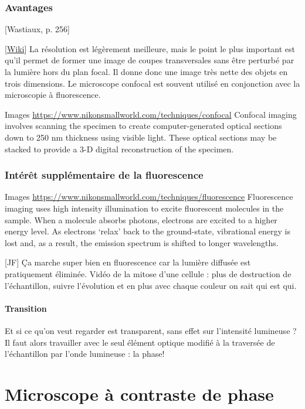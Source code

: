 \documentclass[11pt]{report}
\numberwithin{figure}{section}
\numberwithin{equation}{section}
\numberwithin{table}{section}
\newcommand{\1}{\boldsymbol{1}}
\begin{document}
\subsubsection{Avantages}

[Wastiaux, p. 256]

[\href{https://fr.wikipedia.org/wiki/Microscope_%C3%A0_contraste_de_phase}{Wiki}] La résolution est légèrement meilleure, mais le point le plus important est qu'il permet de former une image de coupes transversales sans être perturbé par la lumière hors du plan focal. Il donne donc une image très nette des objets en trois dimensions. Le microscope confocal est souvent utilisé en conjonction avec la microscopie à fluorescence.

Images \url{https://www.nikonsmallworld.com/techniques/confocal} Confocal imaging involves scanning the specimen to create computer-generated optical sections down to 250 nm thickness using visible light. These optical sections may be stacked to provide a 3-D digital reconstruction of the specimen.

\subsubsection{Intérêt supplémentaire de la fluorescence}

Images \url{https://www.nikonsmallworld.com/techniques/fluorescence} Fluorescence imaging uses high intensity illumination to excite fluorescent molecules in the sample. When a molecule absorbs photons, electrons are excited to a higher energy level. As electrons ‘relax’ back to the ground-state, vibrational energy is lost and, as a result, the emission spectrum is shifted to longer wavelengths.

[JF] Ça marche super bien en fluorescence car la lumière diffusée est pratiquement éliminée. Vidéo de la mitose
d’une cellule : plus de destruction de l’échantillon, suivre l’évolution et en plus avec chaque couleur on sait qui est
qui. 


\paragraph{Transition} Et si ce qu'on veut regarder est transparent, sans effet sur l’intensité lumineuse ? Il faut alors travailler avec le seul élément optique modifié à la traversée de l’échantillon par l’onde lumineuse : la phase!


\section{Microscope à contraste de phase}
\end{document}
